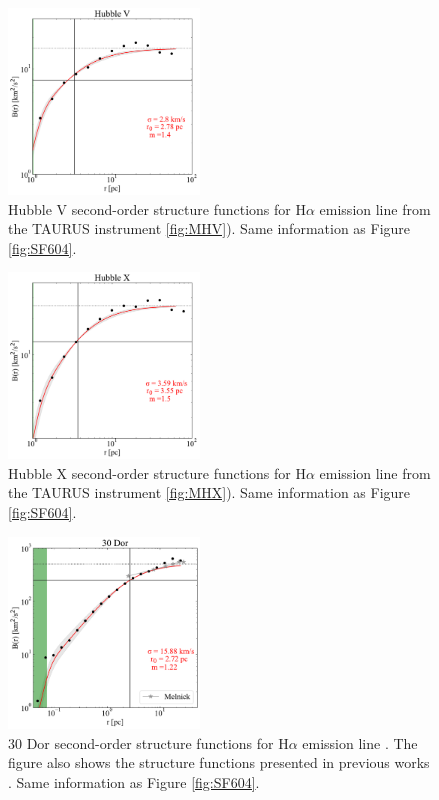 \documentclass[fleqn,usenatbib, useAMS, a4paper]{mnras}
\begin{document}
\begin{figure}
\centering 
\includegraphics[width=2in]{Figures/SFplots/hubbleV}
\caption{Hubble V second-order structure functions for H$\alpha$ emission line from the TAURUS instrument \ref{fig:MHV}).
Same information as Figure \ref{fig:SF604}.}
\label{fig:SFV}
\end{figure}

\begin{figure}
\centering 
\includegraphics[width=2in]{Figures/SFplots/hubbleX.pdf}
\caption{Hubble X second-order structure functions for H$\alpha$ emission line from the TAURUS instrument \ref{fig:MHX}).
Same information as Figure \ref{fig:SF604}.}
\label{fig:SFX}
\end{figure}

\begin{figure}
\centering 
\includegraphics[width=2in]{Figures/SFplots/tarantula}
\caption{30 Dor second-order structure functions for H$\alpha$ emission line \citep{Castro:2018a}.
The figure also shows the structure functions presented in previous works \citep{2019arXiv191203543M}.
Same information as Figure \ref{fig:SF604}.}
\label{fig:SF30Dor}
\end{figure}
\end{document}
